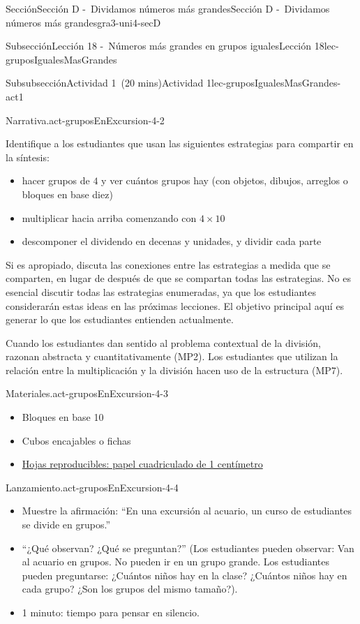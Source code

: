 \documentclass[oneside,10pt,]{article}
\begin{document}
\begin{sectionptx}{Sección}{Sección D -~Dividamos números más grandes}{}{Sección D -~Dividamos números más grandes}{}{}{gra3-uni4-secD}
\begin{subsectionptx}{Subsección}{Lección 18 -~Números más grandes en grupos iguales}{}{Lección 18}{}{}{lec-gruposIgualesMasGrandes}
\begin{subsubsectionptx}{Subsubsección}{Actividad 1~(20 mins)}{}{Actividad 1}{}{}{lec-gruposIgualesMasGrandes-act1}
\begin{paragraphs}{Narrativa.}{act-gruposEnExcursion-4-2}
\par
Identifique a los estudiantes que usan las siguientes estrategias para compartir en la síntesis:%
%
\begin{itemize}[label=\textbullet]
\item{}hacer grupos de \(4\) y ver cuántos grupos hay (con objetos, dibujos, arreglos o bloques en base diez)%
\item{}multiplicar hacia arriba comenzando con \(4 \times10\)%
\item{}descomponer el dividendo en decenas y unidades, y dividir cada parte%
\end{itemize}
Si es apropiado, discuta las conexiones entre las estrategias a medida que se comparten, en lugar de después de que se compartan todas las estrategias. No es esencial discutir todas las estrategias enumeradas, ya que los estudiantes considerarán estas ideas en las próximas lecciones. El objetivo principal aquí es generar lo que los estudiantes entienden actualmente.%
\par
Cuando los estudiantes dan sentido al problema contextual de la división, razonan abstracta y cuantitativamente (MP2). Los estudiantes que utilizan la relación entre la multiplicación y la división hacen uso de la estructura (MP7).%
\end{paragraphs}%
\begin{paragraphs}{Materiales.}{act-gruposEnExcursion-4-3}%
%
\begin{itemize}[label=\textbullet]
\item{}Bloques en base 10%
\item{}Cubos encajables o fichas%
\item{}\hyperref[blm-papelCuadriculadoCentimetro]{Hojas reproducibles: papel cuadriculado de 1 centímetro}%
\end{itemize}
\end{paragraphs}%
\begin{paragraphs}{Lanzamiento.}{act-gruposEnExcursion-4-4}%
%
\begin{itemize}[label=\textbullet]
\item{}Muestre la afirmación: ``En una excursión al acuario, un curso de estudiantes se divide en grupos.''%
\item{}``¿Qué observan? ¿Qué se preguntan?'' (Los estudiantes pueden observar: Van al acuario en grupos. No pueden ir en un grupo grande. Los estudiantes pueden preguntarse: ¿Cuántos niños hay en la clase? ¿Cuántos niños hay en cada grupo? ¿Son los grupos del mismo tamaño?).%
\item{}1 minuto: tiempo para pensar en silencio.%

\end{itemize}
\end{paragraphs}
\end{subsubsectionptx}
\end{subsectionptx}
\end{sectionptx}
\end{document}
